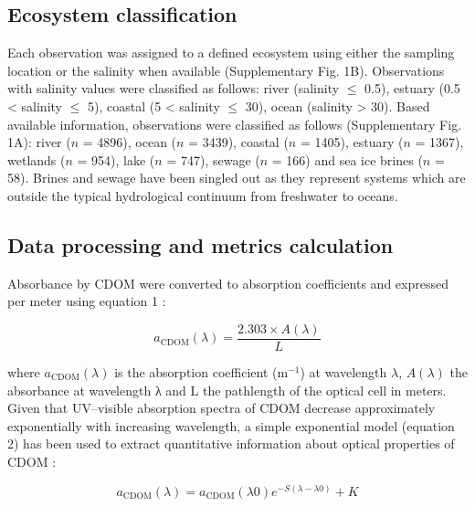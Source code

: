 \subsection*{Ecosystem classification}

Each observation was assigned to a defined ecosystem using either the sampling location or the salinity when available (Supplementary Fig. 1B). Observations with salinity values were classified as follows: river (salinity $\leq$ 0.5), estuary (0.5 < salinity $\leq$ 5), coastal (5 < salinity $\leq$ 30), ocean (salinity > 30). Based available information, observations were classified as follows (Supplementary Fig. 1A): river ($n$ = 4896), ocean ($n$ = 3439), coastal ($n$ = 1405), estuary ($n$ = 1367), wetlands ($n$ = 954), lake ($n$ = 747), sewage ($n$ = 166) and sea ice brines ($n$ = 58). Brines and sewage have been singled out as they represent systems which are outside the typical hydrological continuum from freshwater to oceans.

\subsection*{Data processing and metrics calculation}

Absorbance by CDOM were converted to absorption coefficients and expressed per meter using equation 1 \citep{Kirk1994}:

\begin{equation}
  a_{\text{CDOM}}(\lambda) = \frac{2.303 \times A(\lambda)}{L}
\end{equation}

where $a_{\text{CDOM}}(\lambda)$ is the absorption coefficient (m$^{−1}$) at wavelength $\lambda$, $A(\lambda)$ the absorbance at wavelength λ and L the pathlength of the optical cell in meters. Given that UV–visible absorption spectra of CDOM decrease approximately exponentially with increasing wavelength, a simple exponential model (equation 2) has been used to extract quantitative information about optical properties of CDOM \citep{Jerlov1968, Bricaud1981, Stedmon2001}:

\begin{equation}
  a_{\text{CDOM}}(\lambda) = a_{\text{CDOM}}(\lambda0)e^{-S(\lambda - \lambda0)} + K
  \label{eq:exp_cdom}
\end{equation}

